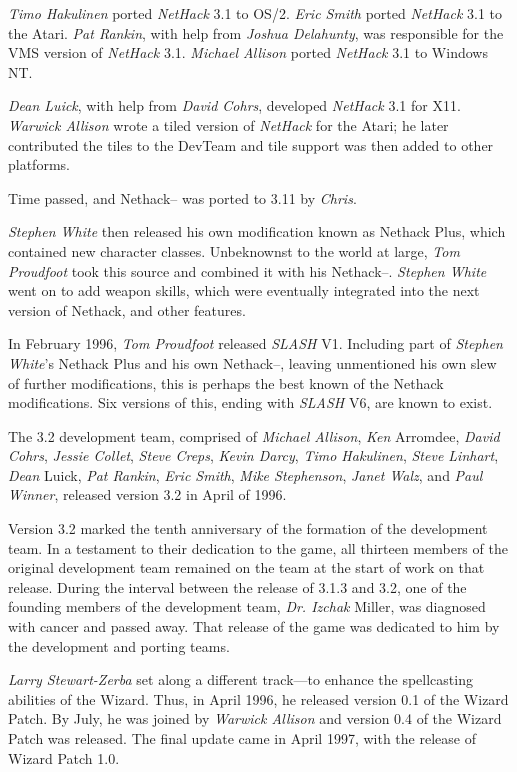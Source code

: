 {\it Timo Hakulinen\/} ported {\it NetHack\/} 3.1 to OS/2.  {\it Eric Smith\/}
ported {\it NetHack\/} 3.1 to the Atari.  {\it Pat Rankin}, with help from
{\it Joshua Delahunty}, was responsible for the VMS version of {\it NetHack\/} 3.1.
{\it Michael Allison\/} ported {\it NetHack\/} 3.1 to Windows NT.

{\it Dean Luick}, with help from {\it David Cohrs}, developed {\it NetHack\/}
3.1 for X11.
{\it Warwick Allison\/} wrote a tiled version of {\it NetHack\/} for the Atari;
he later contributed the tiles to the DevTeam and tile support was
then added to other platforms.

Time passed,  and Nethack-- was ported to 3.11 by {\it Chris}.

{\it Stephen White\/} then released his own modification known as
Nethack Plus,  which contained new character classes.  Unbeknownst
to the world at large,  {\it Tom Proudfoot\/} took this source and
combined it with his Nethack--.  {\it Stephen White\/} went on to add
weapon skills,  which were eventually integrated into the next version
of Nethack,  and other features.

In February 1996,  {\it Tom Proudfoot\/} released {\it SLASH\/} V1.  Including
part of {\it Stephen White\/}'s Nethack Plus and his own Nethack--,  leaving
unmentioned his own slew of further modifications,  this is perhaps
the best known of the Nethack modifications.  Six versions of this,  ending
with {\it SLASH\/} V6,  are known to exist.

The 3.2 development team, comprised of {\it Michael Allison}, {\it Ken}
Arromdee, {\it David Cohrs}, {\it Jessie Collet}, {\it Steve Creps},
{\it Kevin Darcy}, {\it Timo Hakulinen}, {\it Steve Linhart}, {\it Dean}
Luick, {\it Pat Rankin}, {\it Eric Smith}, {\it Mike Stephenson},
{\it Janet Walz}, and {\it Paul Winner}, released version 3.2 in April of
1996.

Version 3.2 marked the tenth anniversary of the formation of the development
team.  In a testament to their dedication to the game, all thirteen members
of the original development team remained on the team at the start of work
on that release.  During the interval between the release of 3.1.3
and 3.2, one of the founding members of the development team, {\it Dr. Izchak}
Miller, was diagnosed with cancer and passed away.  That release of the
game was dedicated to him by the development and porting teams.

{\it Larry Stewart-Zerba\/} set along a different track---to enhance the
spellcasting abilities of the Wizard.   Thus, in April 1996,  he released
version 0.1 of the Wizard Patch.  By July,  he was joined by
{\it Warwick Allison\/} and version 0.4 of the Wizard Patch was released.
The final update came in April 1997,  with the release of
Wizard Patch 1.0.

